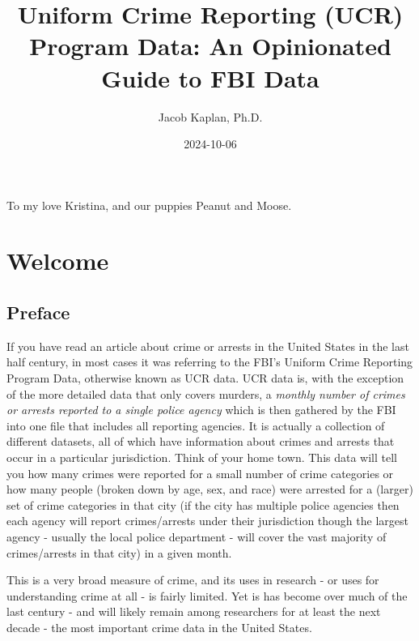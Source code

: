 \documentclass[
]{krantz}
\title{Uniform Crime Reporting (UCR) Program Data: An
Opinionated Guide to FBI Data}
\author{Jacob Kaplan, Ph.D.}
\date{2024-10-06}
\begin{document}
\maketitle

\thispagestyle{empty}
\begin{center}
To my love Kristina, and our puppies Peanut and Moose.
\end{center}

\setlength{\abovedisplayskip}{-5pt}
\setlength{\abovedisplayshortskip}{-5pt}

{
\hypersetup{linkcolor=}
\setcounter{tocdepth}{2}
\tableofcontents
}
\mainmatter

\part{Welcome}\label{part-welcome}

\chapter{Preface}\label{preface}

If you have read an article about crime or arrests in the
United States in the last half century, in most cases it was
referring to the FBI's Uniform Crime Reporting Program Data,
otherwise known as UCR data. UCR data is, with the exception
of the more detailed data that only covers murders, a
\emph{monthly number of crimes or arrests reported to a
single police agency} which is then gathered by the FBI into
one file that includes all reporting agencies. It is
actually a collection of different datasets, all of which
have information about crimes and arrests that occur in a
particular jurisdiction. Think of your home town. This data
will tell you how many crimes were reported for a small
number of crime categories or how many people (broken down
by age, sex, and race) were arrested for a (larger) set of
crime categories in that city (if the city has multiple
police agencies then each agency will report crimes/arrests
under their jurisdiction though the largest agency - usually
the local police department - will cover the vast majority
of crimes/arrests in that city) in a given month.

This is a very broad measure of crime, and its uses in
research - or uses for understanding crime at all - is
fairly limited. Yet is has become over much of the last
century - and will likely remain among researchers for at
least the next decade - the most important crime data in the
United States.
\end{document}

